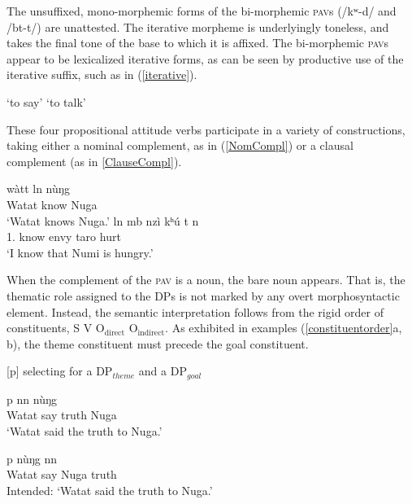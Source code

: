 \documentclass[output=paper,colorlinks,citecolor=brown]{langscibook}
\begin{document}
The unsuffixed, mono-morphemic forms of the bi-morphemic \textsc{pav}s (/kʷ\epL-d\schwaL/ and /b\epH t-t\schwaH/) are unattested. The iterative morpheme is underlyingly toneless, and takes the final tone of the base to which it is affixed. The bi-morphemic \textsc{pav}s appear to be lexicalized iterative forms, as can be seen by productive use of the iterative suffix, such as in (\ref{iterative}).

\ea \label{iterative}
    \begin{xlist}
       \tab `to say'
      \tab `to talk'
    \end{xlist}
\z

These four propositional attitude verbs participate in a variety of constructions, taking either a nominal complement, as in (\ref{NomCompl}) or a clausal complement (as in \ref{ClauseCompl}).

\ea
    \begin{xlist}
    \ex \label{NomCompl}
        \gll    w{à}t\epL\epH t l\epL\epH n n{ù}{ŋ}g\epL \\
                Watat           know        Nuga    \\
        \glt    `Watat knows Nuga.'
    \ex \label{ClauseCompl}
         l\epH n     {mb\baruL}    nzì kʰ{ú} \epL\epH t n\dz\epH        \\
                1.  know      envy taro  hurt  \\
        \glt    `I know that Numi is hungry.'
    \end{xlist}
\z

When the complement of the \textsc{pav} is a noun, the bare noun appears. That is, the thematic role assigned to the DPs is not marked by any overt morphosyntactic element. Instead, the semantic interpretation follows from the rigid order of constituents, S V O$_{\text{direct}}$ O$_{\text{indirect}}$. As exhibited in examples (\ref{constituentorder}a, b), the theme constituent must precede the goal constituent.

\ea \label{constituentorder}
{[p]} selecting for a DP$_{theme}$ and a DP$_{goal}$ \\
    \begin{xlist}
    \ex
         {p} {n\baruH\ds n\baruH} {n{ù}{ŋ}g\epL}\\
             Watat say truth Nuga \\
        \glt `Watat said the truth to Nuga.'

    \ex
         {p} {n{ù}{ŋ}g\epL} {n\baruH\ds n\baruH} \\
             Watat say Nuga truth \\
        \glt Intended: `Watat said the truth to Nuga.'
    \end{xlist}
\z
\end{document}
